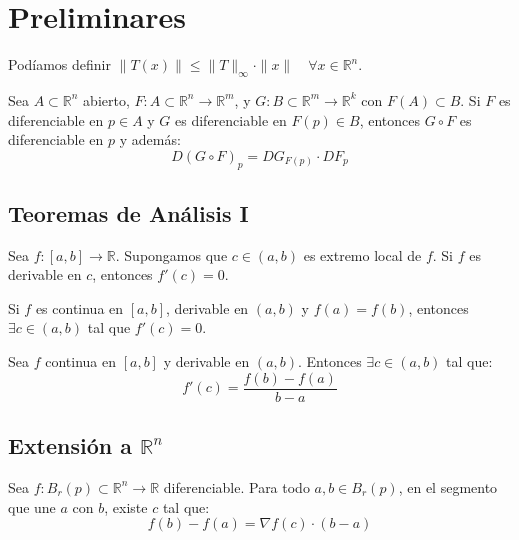 \section{Preliminares}

Podíamos definir \(\| T(x) \| \le \| T \|_{\infty} \cdot \| x \| \quad \forall x \in \mathbb{R}^n\).

\begin{theorem}
    Sea \(A \subset \mathbb{R}^n\) abierto, \(F: A \subset \mathbb{R}^n \to \mathbb{R}^m\), y \(G: B \subset \mathbb{R}^m \to \mathbb{R}^k\) con \(F(A) \subset B\). Si \(F\) es diferenciable en \(p \in A\) y \(G\) es diferenciable en \(F(p) \in B\), entonces \(G \circ F\) es diferenciable en \(p\) y además:
    \[ D(G \circ F)_p = DG_{F(p)} \cdot DF_p \]
\end{theorem}

\subsection{Teoremas de Análisis I}

\begin{theorem}
    Sea \(f: [a,b] \to \mathbb{R}\). Supongamos que \(c \in (a,b)\) es extremo local de \(f\). Si \(f\) es derivable en \(c\), entonces \(f'(c) = 0\).
\end{theorem}

\begin{theorem}
    Si \(f\) es continua en \([a,b]\), derivable en \((a,b)\) y \(f(a) = f(b)\), entonces \(\exists c \in (a,b)\) tal que \(f'(c) = 0\).
\end{theorem}

\begin{theorem}
    Sea \(f\) continua en \([a,b]\) y derivable en \((a,b)\). Entonces \(\exists c \in (a,b)\) tal que:
    \[ f'(c) = \frac{f(b) - f(a)}{b - a} \]
\end{theorem}

\subsection{Extensión a \(\mathbb{R}^n\)}

\begin{theorem}
    Sea \(f: B_r(p) \subset \mathbb{R}^n \to \mathbb{R}\) diferenciable. Para todo \(a, b \in B_r(p)\), en el segmento que une \(a\) con \(b\), existe \(c\) tal que:
    \[ f(b) - f(a) = \nabla f(c) \cdot (b - a) \]
\end{theorem}

